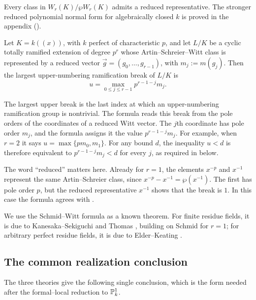 Every class in $W_r(K)/\wp W_r(K)$ admits a reduced representative.
The stronger reduced polynomial normal form for algebraically closed $k$ is
proved in the appendix ().

\begin{theorem}
\label{theorem:schmid_witt_break_formula}
Let $K=k((x))$, with $k$ perfect of characteristic $p$, and let $L/K$ be a
cyclic totally ramified extension of degree $p^r$ whose
Artin--Schreier--Witt class is represented by a reduced vector
$\vec g=(g_0,\dots,g_{r-1})$, with $m_j:=m(g_j)$. Then the largest
upper-numbering ramification break of $L/K$ is
\[
u=\max_{0\leq j\leq r-1}p^{r-1-j}m_j.
\]
\end{theorem}

The largest upper break is the last index at which an upper-numbering
ramification group is nontrivial. The formula reads this break from the pole
orders of the coordinates of a reduced Witt vector. The $j$th coordinate has
pole order $m_j$, and the formula assigns it the value $p^{r-1-j}m_j$.
For example, when $r=2$ it says $u=\max\{pm_0,m_1\}$. For any bound
$d$, the inequality $u<d$ is therefore equivalent to
$p^{r-1-j}m_j<d$ for every $j$, as required in
 below.

The word ``reduced'' matters here. Already for $r=1$, the elements
$x^{-p}$ and $x^{-1}$ represent the same Artin--Schreier class, since
$x^{-p}-x^{-1}=\wp(x^{-1})$. The first has pole order $p$, but the reduced
representative $x^{-1}$ shows that the break is $1$. In this case the formula
agrees with .

We use the Schmid--Witt formula as a known theorem. For finite residue
fields, it is due to Kanesaka--Sekiguchi \cite{KanesakaSekiguchi1979} and
Thomas \cite{Thomas2005}, building on Schmid \cite{Schmid1937} for $r=1$;
for arbitrary perfect residue fields, it is due to Elder--Keating
\cite{ElderKeating2025}.

\subsection*{The common realization conclusion}

The three theories give the following single conclusion, which is the form
needed after the formal--local reduction to $\mathbb{P}^1_k$.

